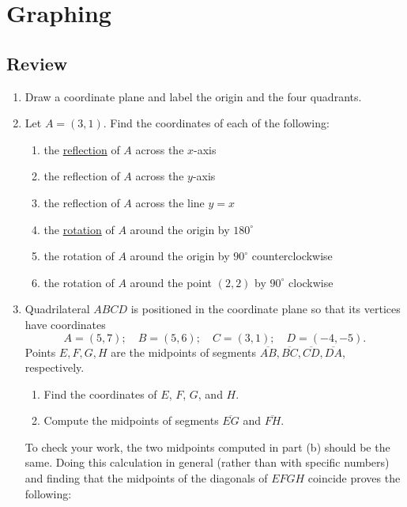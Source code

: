 \section{Graphing}

\subsection{Review}

\begin{enumerate}
\item Draw a coordinate plane and label the origin and the four quadrants.
\item Let $A = (3,1)$. Find the coordinates of each of the following:
\begin{enumerate}
\item the \href{https://en.wikipedia.org/wiki/Reflection_(mathematics)}{reflection} of $A$ across the $x$-axis
\item the reflection of $A$ across the $y$-axis
\item the reflection of $A$ across the line $y = x$
\item the \href{https://en.wikipedia.org/wiki/Rotation_(mathematics)}{rotation} of $A$ around the origin by $180^{\circ}$
\item the rotation of $A$ around the origin by $90^{\circ}$ counterclockwise
\item the rotation of $A$ around the point $(2,2)$ by $90^{\circ}$ clockwise
\end{enumerate}
\item Quadrilateral $ABCD$ is positioned in the coordinate plane so that its vertices have coordinates
\begin{equation*}
A = (5, 7);\quad B = (5, 6);\quad C = (3, 1);\quad D = (-4, -5).
\end{equation*}
Points $E, F, G, H$ are the midpoints of segments $\overline{AB}, \overline{BC}, \overline{CD}, \overline{DA}$, respectively.
\begin{enumerate}
\item Find the coordinates of $E$, $F$, $G$, and $H$.
\item Compute the midpoints of segments $\overline{EG}$ and $\overline{FH}$.
\end{enumerate}
To check your work, the two midpoints computed in part (b) should be the same. Doing this calculation in general (rather than with specific numbers) and finding that the midpoints of the diagonals of $EFGH$ coincide proves the following:
\begin{quote}

\end{quote}
\end{enumerate}
